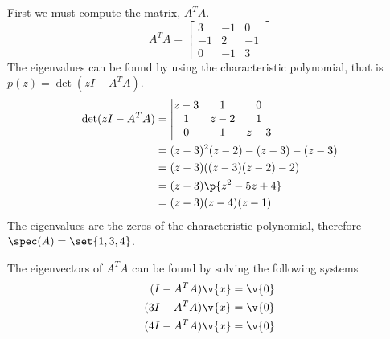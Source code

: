 \documentclass[11pt]{article}
\begin{document}
\begin{enumerate}
\begin{enumerate}
                First we must compute the matrix, $A^T A$.
                \[
                    A^T A =
                    \begin{bmatrix}
                        3 & -1 & 0 \\
                        -1 & 2 & -1 \\
                        0 & -1 & 3
                    \end{bmatrix}
                \]
                The eigenvalues can be found by using the characteristic
                polynomial, that is $p(z) = \det(zI - A^T A)$.
                \begin{align*}
                    \det(zI - A^T A) &=
                    \begin{vmatrix}
                        z - 3 &    1 &     0 \\
                           1 & z - 2 &    1 \\
                            0 &    1 & z - 3
                    \end{vmatrix} \\
                    &= (z - 3)^2(z - 2) - (z - 3) - (z - 3) \\
                    &= (z - 3)((z - 3)(z - 2) - 2) \\
                    &= (z - 3)\p{z^2 - 5z + 4} \\
                    &= (z - 3)(z - 4)(z - 1)
                \end{align*}
                The eigenvalues are the zeros of the characteristic polynomial,
                therefore $\spec(A) = \set{1, 3, 4}$.

                The eigenvectors of $A^T A$ can be found by solving the following systems
                \begin{align*}
                    (I - A^T A)\v{x} &= \v{0} \\
                    (3I - A^T A)\v{x} &= \v{0} \\
                    (4I - A^T A)\v{x} &= \v{0} \\
                \end{align*}


\end{enumerate}
\end{enumerate}
\end{document}
